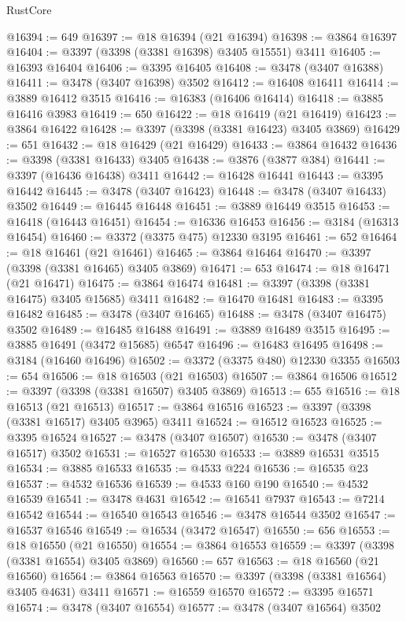\begin{lexlean}{RustCore}
\begin{coremodule}
@16394 := 649
@16397 := @18 @16394 (@21 @16394)
@16398 := @3864 @16397
@16404 := @3397 (@3398 (@3381 @16398) @3405 @15551) @3411
@16405 := @16393 @16404
@16406 := @3395 @16405
@16408 := @3478 (@3407 @16388)
@16411 := @3478 (@3407 @16398) @3502
@16412 := @16408 @16411
@16414 := @3889 @16412 @3515
@16416 := @16383 (@16406 @16414)
@16418 := @3885 @16416 @3983
@16419 := 650
@16422 := @18 @16419 (@21 @16419)
@16423 := @3864 @16422
@16428 := @3397 (@3398 (@3381 @16423) @3405 @3869)
@16429 := 651
@16432 := @18 @16429 (@21 @16429)
@16433 := @3864 @16432
@16436 := @3398 (@3381 @16433) @3405
@16438 := @3876 (@3877 @384)
@16441 := @3397 (@16436 @16438) @3411
@16442 := @16428 @16441
@16443 := @3395 @16442
@16445 := @3478 (@3407 @16423)
@16448 := @3478 (@3407 @16433) @3502
@16449 := @16445 @16448
@16451 := @3889 @16449 @3515
@16453 := @16418 (@16443 @16451)
@16454 := @16336 @16453
@16456 := @3184 (@16313 @16454)
@16460 := @3372 (@3375 @475) @12330 @3195
@16461 := 652
@16464 := @18 @16461 (@21 @16461)
@16465 := @3864 @16464
@16470 := @3397 (@3398 (@3381 @16465) @3405 @3869)
@16471 := 653
@16474 := @18 @16471 (@21 @16471)
@16475 := @3864 @16474
@16481 := @3397 (@3398 (@3381 @16475) @3405 @15685) @3411
@16482 := @16470 @16481
@16483 := @3395 @16482
@16485 := @3478 (@3407 @16465)
@16488 := @3478 (@3407 @16475) @3502
@16489 := @16485 @16488
@16491 := @3889 @16489 @3515
@16495 := @3885 @16491 (@3472 @15685) @6547
@16496 := @16483 @16495
@16498 := @3184 (@16460 @16496)
@16502 := @3372 (@3375 @480) @12330 @3355
@16503 := 654
@16506 := @18 @16503 (@21 @16503)
@16507 := @3864 @16506
@16512 := @3397 (@3398 (@3381 @16507) @3405 @3869)
@16513 := 655
@16516 := @18 @16513 (@21 @16513)
@16517 := @3864 @16516
@16523 := @3397 (@3398 (@3381 @16517) @3405 @3965) @3411
@16524 := @16512 @16523
@16525 := @3395 @16524
@16527 := @3478 (@3407 @16507)
@16530 := @3478 (@3407 @16517) @3502
@16531 := @16527 @16530
@16533 := @3889 @16531 @3515
@16534 := @3885 @16533
@16535 := @4533 @224
@16536 := @16535 @23
@16537 := @4532 @16536
@16539 := @4533 @160 @190
@16540 := @4532 @16539
@16541 := @3478 @4631
@16542 := @16541 @7937
@16543 := @7214 @16542
@16544 := @16540 @16543
@16546 := @3478 @16544 @3502
@16547 := @16537 @16546
@16549 := @16534 (@3472 @16547)
@16550 := 656
@16553 := @18 @16550 (@21 @16550)
@16554 := @3864 @16553
@16559 := @3397 (@3398 (@3381 @16554) @3405 @3869)
@16560 := 657
@16563 := @18 @16560 (@21 @16560)
@16564 := @3864 @16563
@16570 := @3397 (@3398 (@3381 @16564) @3405 @4631) @3411
@16571 := @16559 @16570
@16572 := @3395 @16571
@16574 := @3478 (@3407 @16554)
@16577 := @3478 (@3407 @16564) @3502

\end{coremodule}
\end{lexlean}
